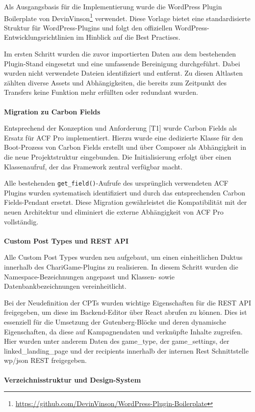 Als Ausgangsbasis für die Implementierung wurde die WordPress Plugin Boilerplate von DevinVinson\footnote{\url{https://github.com/DevinVinson/WordPress-Plugin-Boilerplate}} verwendet.
Diese Vorlage bietet eine standardisierte Struktur für WordPress-Plugins und folgt den offiziellen WordPress-Entwicklungsrichtlinien im Hinblick auf die Best Practises.

Im ersten Schritt wurden die zuvor importierten Daten aus dem bestehenden Plugin-Stand eingesetzt und eine umfassende Bereinigung durchgeführt.
Dabei wurden nicht verwendete Dateien identifiziert und entfernt.
Zu diesen Altlasten zählten diverse Assets und Abhängigkeiten, die bereits zum Zeitpunkt des Transfers keine Funktion mehr erfüllten oder redundant wurden.
\\\\
\textbf{Migration zu Carbon Fields}

Entsprechend der Konzeption und Anforderung [T1] wurde Carbon Fields als Ersatz für ACF Pro implementiert.
Hierzu wurde eine dedizierte Klasse für den Boot-Prozess von Carbon Fields erstellt und über Composer als Abhängigkeit in die neue Projektstruktur eingebunden.
Die Initialisierung erfolgt über einen Klassenaufruf, der das Framework zentral verfügbar macht.

Alle bestehenden \texttt{get\_field()}-Aufrufe des ursprünglich verwendeten ACF Plugins wurden systematisch identifiziert und durch das entsprechenden Carbon Fields-Pendant ersetzt.
Diese Migration gewährleistet die Kompatibilität mit der neuen Architektur und eliminiert die externe Abhängigkeit von ACF Pro vollständig.
\\\\
\textbf{Custom Post Types und REST API}

Alle Custom Post Types wurden neu aufgebaut, um einen einheitlichen Duktus innerhalb des ChariGame-Plugins zu realisieren.
In diesem Schritt wurden die Namespace-Bezeichnungen angepasst und Klassen- sowie Datenbankbezeichnungen vereinheitlicht.

Bei der Neudefinition der CPTs wurden wichtige Eigenschaften für die REST API freigegeben, um diese im Backend-Editor über React abrufen zu können.
Dies ist essenziell für die Umsetzung der Gutenberg-Blöcke und deren dynamische Eigenschaften, da diese auf Kampagnendaten und verknüpfte Inhalte zugreifen.
Hier wurden unter anderem Daten des game_type, der game_settings, der linked_landing_page und der recipients innerhalb der internen Rest Schnittstelle wp/json REST freigegeben.
\\\\
\textbf{Verzeichnisstruktur und Design-System}

